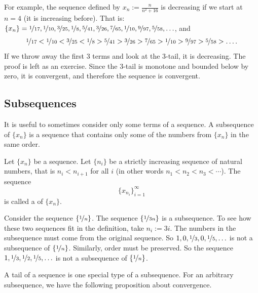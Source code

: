 For example, the sequence defined by $x_n := \frac{n}{n^2+16}$ is decreasing
if we start at $n=4$ (it is increasing before).  That is:
$\{ x_n \} =
\nicefrac{1}{17},
\nicefrac{1}{10},
\nicefrac{3}{25},
\nicefrac{1}{8},
\nicefrac{5}{41},
\nicefrac{3}{26},
\nicefrac{7}{65},
\nicefrac{1}{10},
\nicefrac{9}{97},
\nicefrac{5}{58},\ldots$, and 
\begin{equation*}
\nicefrac{1}{17} <
\nicefrac{1}{10} <
\nicefrac{3}{25} <
\nicefrac{1}{8} >
\nicefrac{5}{41} >
\nicefrac{3}{26} >
\nicefrac{7}{65} >
\nicefrac{1}{10} >
\nicefrac{9}{97} >
\nicefrac{5}{58} > \ldots .
\end{equation*}
If we throw away the first 3 terms
and look at the 3-tail, it is decreasing.  The proof is left as an exercise.  Since the 3-tail
is monotone and bounded below by zero, it is convergent, and therefore the sequence is convergent.

\subsection{Subsequences}

It is useful to sometimes consider only some terms of a sequence.
A subsequence of $\{ x_n \}$ is a sequence that contains
only some of the numbers from $\{ x_n \}$ in the same order.

\begin{defn}
Let $\{ x_n \}$ be a sequence.
Let $\{ n_i \}$ be a strictly increasing sequence of natural
numbers, that is $n_i < n_{i+1}$ for all $i$ (in other words $n_1 < n_2 < n_3 < \cdots$).  
The sequence
\begin{equation*}
\{ x_{n_i} \}_{i=1}^\infty
\end{equation*}
is called 
a \emph{} of $\{ x_n \}$.
\end{defn}

Consider the sequence $\{ \nicefrac{1}{n} \}$.  The sequence
$\{ \nicefrac{1}{3n} \}$ is a subsequence.  To see how these two
sequences fit in the definition, take $n_i := 3i$.  
The numbers in the
subsequence must come from the original sequence.  So $1,0,\nicefrac{1}{3},0,
\nicefrac{1}{5},\ldots$
is not a subsequence of $\{ \nicefrac{1}{n} \}$.  Similarly, order
must be preserved.  So
the sequence $1,\nicefrac{1}{3},\nicefrac{1}{2},\nicefrac{1}{5},\ldots$
is not a subsequence of $\{ \nicefrac{1}{n} \}$.

A tail of a sequence is one special type of a subsequence.  For an arbitrary
subsequence, we have the following proposition about convergence.

